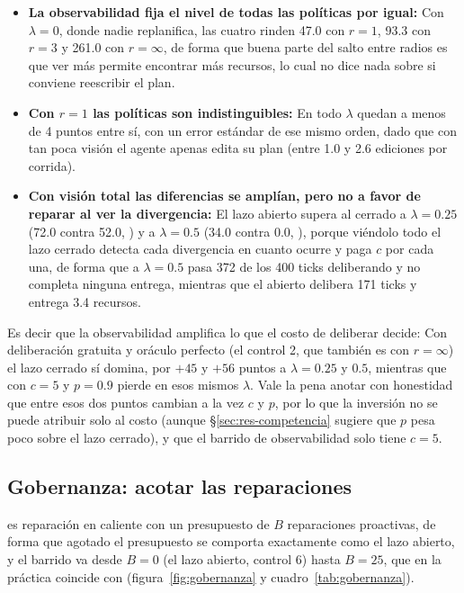 \begin{itemize}[leftmargin=1.4em, itemsep=0.2em]
  \item \textbf{La observabilidad fija el nivel de todas las políticas por igual:} Con $\lambda=0$, donde nadie replanifica, las cuatro rinden 47.0 con $r=1$, 93.3 con $r=3$ y 261.0 con $r=\infty$, de forma que buena parte del salto entre radios es que ver más permite encontrar más recursos, lo cual no dice nada sobre si conviene reescribir el plan.
  \item \textbf{Con $r=1$ las políticas son indistinguibles:} En todo $\lambda$ quedan a menos de 4 puntos entre sí, con un error estándar de ese mismo orden, dado que con tan poca visión el agente apenas edita su plan (entre 1.0 y 2.6 ediciones por corrida).
  \item \textbf{Con visión total las diferencias se amplían, pero no a favor de reparar al ver la divergencia:} El lazo abierto supera al cerrado a $\lambda=0.25$ (72.0 contra 52.0, ) y a $\lambda=0.5$ (34.0 contra 0.0, ), porque viéndolo todo el lazo cerrado detecta cada divergencia en cuanto ocurre y paga $c$ por cada una, de forma que a $\lambda=0.5$ pasa 372 de los 400 ticks deliberando y no completa ninguna entrega, mientras que el abierto delibera 171 ticks y entrega 3.4 recursos.
\end{itemize}

Es decir que la observabilidad amplifica lo que el costo de deliberar decide: Con deliberación gratuita y oráculo perfecto (el control 2, que también es con $r=\infty$) el lazo cerrado sí domina, por $+45$ y $+56$ puntos a $\lambda=0.25$ y $0.5$, mientras que con $c=5$ y $p=0.9$ pierde en esos mismos $\lambda$. Vale la pena anotar con honestidad que entre esos dos puntos cambian a la vez $c$ y $p$, por lo que la inversión no se puede atribuir solo al costo (aunque §\ref{sec:res-competencia} sugiere que $p$ pesa poco sobre el lazo cerrado), y que el barrido de observabilidad solo tiene $c=5$.

\FloatBarrier
\subsection{Gobernanza: acotar las reparaciones}\label{sec:res-gobernanza}

\GOV{} es reparación en caliente con un presupuesto de $B$ reparaciones proactivas, de forma que agotado el presupuesto se comporta exactamente como el lazo abierto, y el barrido va desde $B=0$ (el lazo abierto, control 6) hasta $B=25$, que en la práctica coincide con \CL{} (figura~\ref{fig:gobernanza} y cuadro~\ref{tab:gobernanza}).

